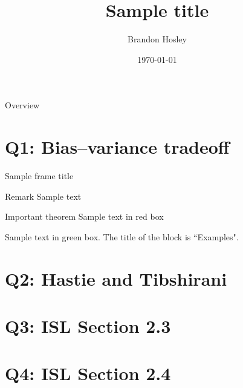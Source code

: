 \documentclass{beamer}
\title{Sample title}
\author{Brandon Hosley}
\institute{University of Illinois - Springfield}
\date{\today}
\begin{document}
\frame{\titlepage}

\begin{frame}{Overview}
\tableofcontents
\end{frame}

\section[Q1]{Q1: Bias–variance tradeoff}

\begin{frame}{Sample frame title}
\begin{block}{Remark}
	Sample text
\end{block}

\begin{alertblock}{Important theorem}
	Sample text in red box
\end{alertblock}

\begin{examples}
	Sample text in green box. The title of the block is ``Examples".
\end{examples}

\end{frame}

\section[Q2]{Q2: Hastie and Tibshirani}
\section[Q3]{Q3: ISL Section 2.3}
\section[Q4]{Q4: ISL Section 2.4}
\end{document}
